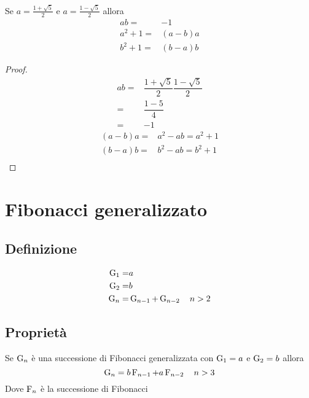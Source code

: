 \begin{lem}[Proprietà]\label{lem:FibpropPhi}
	Se $a=\frac{1+\sqrt{5}}{2}$ e  $a=\frac{1-\sqrt{5}}{2}$ allora
	\begin{align*}
		ab=&-1\\
		a^2+1=&(a-b)a\\
		b^2+1=&(b-a)b
	\end{align*}
\end{lem}
\begin{proof}
	\begin{align*}
		ab=&\dfrac{1+\sqrt{5}}{2}\dfrac{1-\sqrt{5}}{2}\\
		=&\dfrac{1-5}{4}\\
		=&-1
	\end{align*}
\begin{align*}
	(a-b)a=&a^2-ab=a^2+1\\
	(b-a)b=&b^2-ab=b^2+1\\
\end{align*}
\end{proof}
\chapter{Fibonacci generalizzato}
\section{Definizione}
\begin{defn}
	\begin{align}
		\operatorname{G}_{1}=&a\notag\\
		\operatorname{G}_{2}=&b\notag\\
		\operatorname{G}_{n}=&\operatorname{G}_{n-1}+\operatorname{G}_{n-2}\quad n>2\label{eqn:FiboGendef}
	\end{align}
\end{defn}
\section{Proprietà}
\begin{thm}[Derivazione]
	Se $\operatorname{G}_{n}$ è una successione di Fibonacci generalizzata  con $\operatorname{G}_{1}=a$ e $\operatorname{G}_{2}=b$ allora
\begin{equation}
	\operatorname{G}_{n}=b\operatorname{F}_{n-1}+a\operatorname{F}_{n-2}\quad n>3
\end{equation}\label{thm:FibGenDer}
Dove $\operatorname{F}_{n}$ è la successione di Fibonacci
\end{thm}